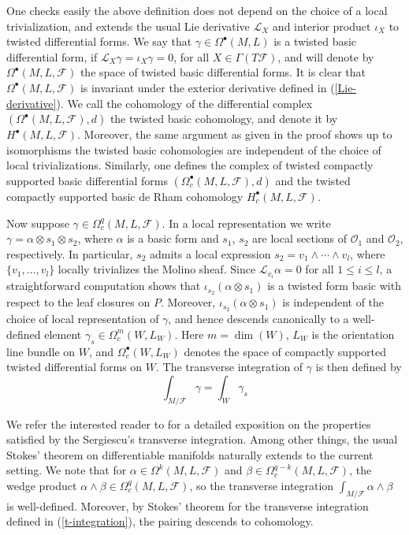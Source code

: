 \documentclass[reqno, 11pt]{amsart}
\theoremstyle{definition}
\theoremstyle{property}
\theoremstyle{remark}
\numberwithin{equation}{section}
\begin{document}
One checks easily the above definition does not depend on the choice of
a local trivialization, and extends the usual Lie derivative $\mathcal{L}_X$ and interior
product $\iota_X$ to twisted differential forms. We say that $\gamma \in \Omega^\bullet(M,L)$ is a
twisted basic differential form, if $\mathcal{L}_X\gamma= \iota_X \gamma= 0$, for all $X \in\Gamma(T\mathcal{F})$, and will
denote by $\Omega^\bullet(M,L,\mathcal{F})$ the space of twisted basic differential forms. It is
clear that $\Omega^\bullet(M,L,\mathcal{F})$ is invariant under the exterior derivative defined in
(\ref{Lie-derivative}). We call the cohomology of the differential complex $(\Omega^\bullet(M,L,\mathcal{F}),d)$
the twisted basic cohomology, and denote it by $H^\bullet(M,L, \mathcal{F})$. Moreover, the
same argument as given in the proof \cite[Prop. 7.5]{BT82} shows up to isomorphisms the twisted basic cohomologies are independent of the choice of local trivializations. Similarly, one defines
the complex of twisted compactly supported basic differential forms $(\Omega^\bullet_c(M,L,\mathcal{F}), d)$ and the twisted compactly supported basic de Rham cohomology $H^\bullet_c(M,L, \mathcal{F})$.

Now suppose $\gamma \in \Omega_c^q(M, L, \mathcal{F})$. In a local representation we write
$\gamma = \alpha \otimes s_1 \otimes s_2$, where $\alpha$ is a basic form and $s_1$, $s_2$
are local sections of $\mathcal{O}_1$ and $\mathcal{O}_2$, respectively. In particular,
$s_2$ admits a local expression $s_2 = v_1 \wedge \cdots \wedge v_l$, where
$\{v_1, \ldots, v_l\}$ locally trivializes the Molino sheaf. Since $\mathcal{L}_{v_i}\alpha = 0$
for all $1 \leq i \leq l$, a straightforward computation shows that
$\iota_{s_2}(\alpha \otimes s_1)$ is a twisted form basic with respect to the leaf closures on $P$.
Moreover, $\iota_{s_2}(\alpha \otimes s_1)$ is independent of the choice of local
representation of $\gamma$, and hence descends canonically to a well-defined element
$\gamma_s \in \Omega_c^m(W, L_W)$. Here $m = \dim(W)$, $L_W$ is the orientation line
bundle on $W$, and $\Omega_c^\bullet(W, L_W)$ denotes the space of compactly supported twisted
differential forms on $W$. The transverse integration of $\gamma$ is then defined by
\begin{equation}\label{t-integration} \int_{M/\mathcal{F}}\gamma =\int_W \gamma_s\end{equation}

We refer the interested reader to \cite{LS20} for a detailed exposition on the  properties satisfied by the Sergiescu's transverse integration. Among other things, the usual Stokes' theorem on differentiable manifolds naturally extends to the current setting. We note that for $\alpha \in \Omega^k(M, L, \mathcal{F})$ and $\beta \in \Omega_c^{q-k}(M, L, \mathcal{F})$,
the wedge product $\alpha \wedge \beta \in \Omega_c^q(M, L, \mathcal{F})$, so the transverse
integration $\int_{M/\mathcal{F}} \alpha \wedge \beta$ is well-defined. Moreover, by Stokes'
theorem for the transverse integration defined in (\ref{t-integration}), the pairing
descends to cohomology. 
\end{document}
